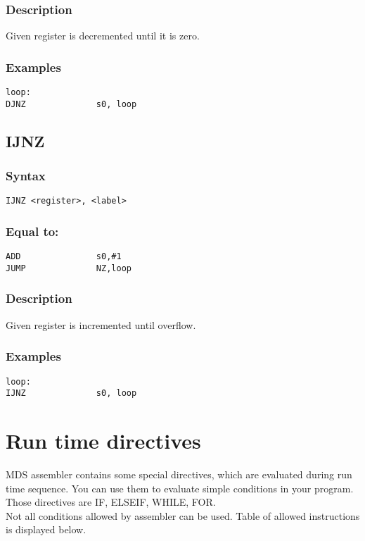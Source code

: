         \subsubsection{Description}
            Given register is decremented until it is zero.

        \subsubsection{Examples}
            \verb'loop:             '\\
            \verb'DJNZ              s0, loop'

    \subsection{IJNZ}
        \subsubsection{Syntax}
            \verb'IJNZ <register>, <label>'

        \subsubsection{Equal to:}
            \verb'ADD               s0,#1'\\
            \verb'JUMP              NZ,loop'

        \subsubsection{Description}
            Given register is incremented until overflow.

        \subsubsection{Examples}
            \verb'loop:             '\\
            \verb'IJNZ              s0, loop'

\section{Run time directives}
    MDS assembler contains some special directives, which are evaluated during run time sequence. You can use them to evaluate simple conditions in your program. Those directives are IF, ELSEIF, WHILE, FOR.\\ Not all conditions allowed by assembler can be used. Table of allowed instructions is displayed below.

